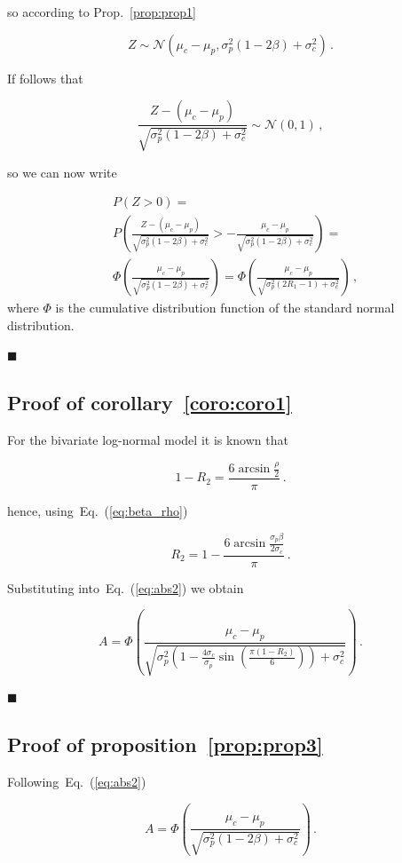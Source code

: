 \documentclass[12pt,a4paper]{article}
\newcommand*{\qed}{\hfill\ensuremath{\blacksquare}}%
\newcommand{\eref}[1]{Eq.~(\ref{eq:#1})}
\newcommand{\pref}[1]{Prop.~\ref{prop:#1}}
\newcommand{\preflong}[1]{proposition~\ref{prop:#1}}
\newcommand{\creflong}[1]{corollary~\ref{coro:#1}}
\newcommand{\be}{\begin{equation}}
\newcommand{\ee}{\end{equation}}
\numberwithin{equation}{section}
\begin{document}
so according to \pref{prop1}

\be
Z \sim \mathcal{N}\left(\mu_c - \mu_p,\sigma_p^2\left(1-2\beta\right) + \sigma_c^2\right)\,.
\ee

If follows that

\be
\frac{Z - \left(\mu_c - \mu_p\right)}{\sqrt{\sigma_p^2\left(1-2\beta\right) + \sigma_c^2}} \sim \mathcal{N}\left(0,1\right)\,,
\ee

so we can now write

\be
\begin{split}
&P\left(Z>0\right) = \\ & P\left(\frac{Z - (\mu_c - \mu_p)}{\sqrt{\sigma_p^2\left(1-2\beta\right) + \sigma_c^2}} > -\frac{\mu_c - \mu_p}{\sqrt{\sigma_p^2\left(1-2\beta\right) + \sigma_c^2}} \right) = \\ &\Phi\left(\frac{\mu_c - \mu_p}{\sqrt{\sigma_p^2\left(1 - 2\beta\right) + \sigma_c^2}}\right) = \Phi\left(\frac{\mu_c - \mu_p}{\sqrt{\sigma_p^2\left(2R_1-1\right) + \sigma_c^2}}\right)\,,
\end{split}
\ee
where $\Phi$ is the cumulative distribution function of the standard normal distribution.

\qed

\subsection{Proof of \creflong{coro1}}

For the bivariate log-normal model it is known that~\citep{trivedi2007copula}

\be
1-R_2 = \frac{6\arcsin{\frac{\rho}{2}}}{\pi}\,.
\ee

hence, using~\eref{beta_rho}

\be
R_2 = 1- \frac{6\arcsin{\frac{\sigma_p\beta}{2\sigma_c}}}{\pi}\,.
\ee

Substituting into~\eref{abs2} we obtain

\be
A = \Phi\left(\frac{\mu_c - \mu_p}{\sqrt{\sigma_p^2\left(1 - \frac{4\sigma_c}{\sigma_p}\sin{\left(\frac{\pi\left(1-R_2\right)}{6}\right)}\right) + \sigma_c^2}}\right) \,.
\ee

\qed

\subsection{Proof of \preflong{prop3}}

Following~\eref{abs2}

\be
A = \Phi\left(\frac{\mu_c - \mu_p}{\sqrt{\sigma_p^2\left(1 - 2\beta\right) + \sigma_c^2}}\right) \,.
\ee
\end{document}
